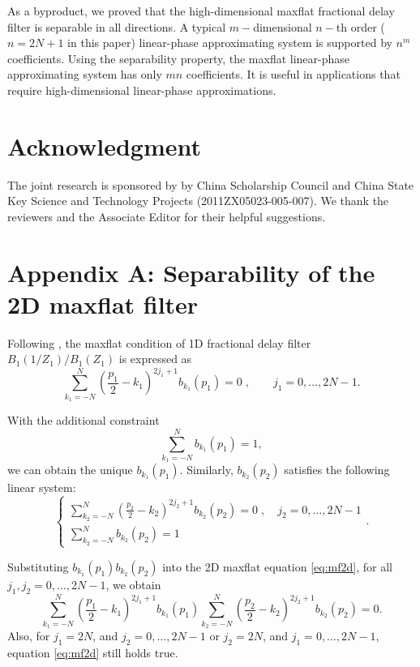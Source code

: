 As a byproduct, 
we proved that the high-dimensional maxflat fractional delay filter 
is separable in all directions.
A typical $m-$dimensional $n-$th order 
($n=2N+1$ in this paper) linear-phase 
approximating system is supported by $n^m$ coefficients.
Using the separability property,
the maxflat linear-phase
approximating system has only $mn$ coefficients.
It is useful in applications that require 
high-dimensional linear-phase approximations.

\section*{Acknowledgment}
The joint research is sponsored by by China Scholarship Council and
China State Key Science and Technology Projects (2011ZX05023-005-007).
We thank the reviewers and the Associate Editor for
their helpful suggestions.

\appendix
\section{Appendix A: Separability of the 2D maxflat filter}

Following \cite{thiran1971recursive}, 
the maxflat condition of 1D fractional delay
filter $B_1(1/Z_1)/B_1(Z_1)$ is expressed as
\begin{equation}
\sum_{k_1=-N}^N(\frac{p_1}{2}-k_1)^{2j_1+1}b_{k_1}(p_1)=0\;,
\qquad j_1=0,\dots,2N-1.
\end{equation}

With the additional constraint \cite[]{chen:2012a}
\begin{equation}
\sum_{k_1=-N}^Nb_{k_1}(p_1)=1,
\end{equation}
we can obtain the unique $b_{k_1}(p_1)$.
Similarly, $b_{k_2}(p_2)$ satisfies 
the following linear system:
\begin{equation}
\left\{\begin{array}{l}
\displaystyle{\sum_{k_2=-N}^N(\frac{p_2}{2}-k_2)^{2j_2+1}b_{k_2}(p_2)=0}\;,
 \quad j_2=0,\dots,2N-1 \\
\displaystyle{\sum_{k_2=-N}^Nb_{k_2}(p_2)=1}
\end{array}\right..
\end{equation}

Substituting $b_{k_1}(p_1)b_{k_2}(p_2)$ into 
the 2D maxflat equation \ref{eq:mf2d}, for all
$j_1,j_2=0,\dots,2N-1$, we obtain
\begin{equation}
\sum_{k_1=-N}^N(\frac{p_1}{2}-k_1)^{2j_1+1}b_{k_1}(p_1)
\sum_{k_2=-N}^N(\frac{p_2}{2}-k_2)^{2j_2+1}b_{k_2}(p_2)=0.
\end{equation}
Also, for
$j_1=2N$, and $j_2=0,\dots,2N-1$ 
or $j_2=2N$, and $j_1=0,\dots,2N-1$,
equation \ref{eq:mf2d} still holds true.

